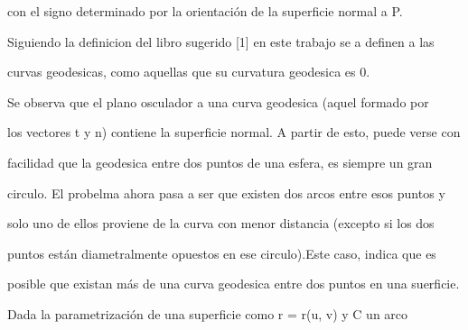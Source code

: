 \documentclass[a4paper,portrait,12pt]{article}
\begin{document}
\begin{flushleft}
con el signo determinado por la orientación de la superficie normal a P.
\end{flushleft}


\begin{flushleft}
Siguiendo la definicion del libro sugerido [1] en este trabajo se a definen a las
\end{flushleft}


\begin{flushleft}
curvas geodesicas, como aquellas que su curvatura geodesica es 0.
\end{flushleft}


\begin{flushleft}
Se observa que el plano osculador a una curva geodesica (aquel formado por
\end{flushleft}


\begin{flushleft}
los vectores t y n) contiene la superficie normal. A partir de esto, puede verse con
\end{flushleft}


\begin{flushleft}
facilidad que la geodesica entre dos puntos de una esfera, es siempre un gran
\end{flushleft}


\begin{flushleft}
circulo. El probelma ahora pasa a ser que existen dos arcos entre esos puntos y
\end{flushleft}


\begin{flushleft}
solo uno de ellos proviene de la curva con menor distancia (excepto si los dos
\end{flushleft}


\begin{flushleft}
puntos están diametralmente opuestos en ese circulo).Este caso, indica que es
\end{flushleft}


\begin{flushleft}
posible que existan más de una curva geodesica entre dos puntos en una suerficie.
\end{flushleft}


\begin{flushleft}
Dada la parametrización de una superficie como r = r(u, v) y C un arco
\end{flushleft}
\end{document}
